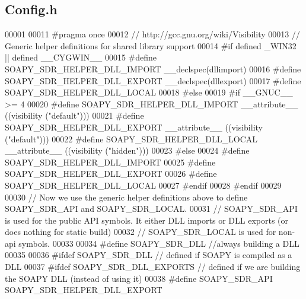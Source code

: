 \subsection{Config.\+h}
\label{Config_8h_source}

\begin{DoxyCode}
00001 
00011 \textcolor{preprocessor}{#pragma once}
00012 \textcolor{comment}{// http://gcc.gnu.org/wiki/Visibility}
00013 \textcolor{comment}{// Generic helper definitions for shared library support}
00014 \textcolor{preprocessor}{#if defined \_WIN32 || defined \_\_CYGWIN\_\_}
00015 \textcolor{preprocessor}{  #define SOAPY\_SDR\_HELPER\_DLL\_IMPORT \_\_declspec(dllimport)}
00016 \textcolor{preprocessor}{  #define SOAPY\_SDR\_HELPER\_DLL\_EXPORT \_\_declspec(dllexport)}
00017 \textcolor{preprocessor}{  #define SOAPY\_SDR\_HELPER\_DLL\_LOCAL}
00018 \textcolor{preprocessor}{#else}
00019 \textcolor{preprocessor}{  #if \_\_GNUC\_\_ >= 4}
00020 \textcolor{preprocessor}{    #define SOAPY\_SDR\_HELPER\_DLL\_IMPORT \_\_attribute\_\_ ((visibility ("default")))}
00021 \textcolor{preprocessor}{    #define SOAPY\_SDR\_HELPER\_DLL\_EXPORT \_\_attribute\_\_ ((visibility ("default")))}
00022 \textcolor{preprocessor}{    #define SOAPY\_SDR\_HELPER\_DLL\_LOCAL  \_\_attribute\_\_ ((visibility ("hidden")))}
00023 \textcolor{preprocessor}{  #else}
00024 \textcolor{preprocessor}{    #define SOAPY\_SDR\_HELPER\_DLL\_IMPORT}
00025 \textcolor{preprocessor}{    #define SOAPY\_SDR\_HELPER\_DLL\_EXPORT}
00026 \textcolor{preprocessor}{    #define SOAPY\_SDR\_HELPER\_DLL\_LOCAL}
00027 \textcolor{preprocessor}{  #endif}
00028 \textcolor{preprocessor}{#endif}
00029 
00030 \textcolor{comment}{// Now we use the generic helper definitions above to define SOAPY\_SDR\_API and SOAPY\_SDR\_LOCAL.}
00031 \textcolor{comment}{// SOAPY\_SDR\_API is used for the public API symbols. It either DLL imports or DLL exports (or does nothing
       for static build)}
00032 \textcolor{comment}{// SOAPY\_SDR\_LOCAL is used for non-api symbols.}
00033 
00034 \textcolor{preprocessor}{#define SOAPY\_SDR\_DLL //always building a DLL}
00035 
00036 \textcolor{preprocessor}{#ifdef SOAPY\_SDR\_DLL // defined if SOAPY is compiled as a DLL}
00037 \textcolor{preprocessor}{  #ifdef SOAPY\_SDR\_DLL\_EXPORTS // defined if we are building the SOAPY DLL (instead of using it)}
00038 \textcolor{preprocessor}{    #define SOAPY\_SDR\_API SOAPY\_SDR\_HELPER\_DLL\_EXPORT}

\end{DoxyCode}
